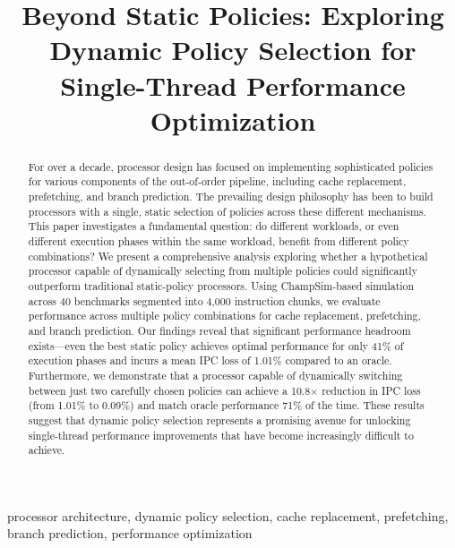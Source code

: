 \documentclass[conference]{IEEEtran}
\begin{document}
\title{Beyond Static Policies: Exploring Dynamic Policy Selection for Single-Thread Performance Optimization}

\author{
}

\maketitle

\begin{abstract}
For over a decade, processor design has focused on implementing sophisticated policies for various components of the out-of-order pipeline, including cache replacement, prefetching, and branch prediction. The prevailing design philosophy has been to build processors with a single, static selection of policies across these different mechanisms. This paper investigates a fundamental question: do different workloads, or even different execution phases within the same workload, benefit from different policy combinations? We present a comprehensive analysis exploring whether a hypothetical processor capable of dynamically selecting from multiple policies could significantly outperform traditional static-policy processors. Using ChampSim-based simulation across 40 benchmarks segmented into 4,000 instruction chunks, we evaluate performance across multiple policy combinations for cache replacement, prefetching, and branch prediction. Our findings reveal that significant performance headroom exists---even the best static policy achieves optimal performance for only 41\% of execution phases and incurs a mean IPC loss of 1.01\% compared to an oracle. Furthermore, we demonstrate that a processor capable of dynamically switching between just two carefully chosen policies can achieve a 10.8$\times$ reduction in IPC loss (from 1.01\% to 0.09\%) and match oracle performance 71\% of the time. These results suggest that dynamic policy selection represents a promising avenue for unlocking single-thread performance improvements that have become increasingly difficult to achieve.
\end{abstract}

\begin{IEEEkeywords}
processor architecture, dynamic policy selection, cache replacement, prefetching, branch prediction, performance optimization
\end{IEEEkeywords}
\end{document}
